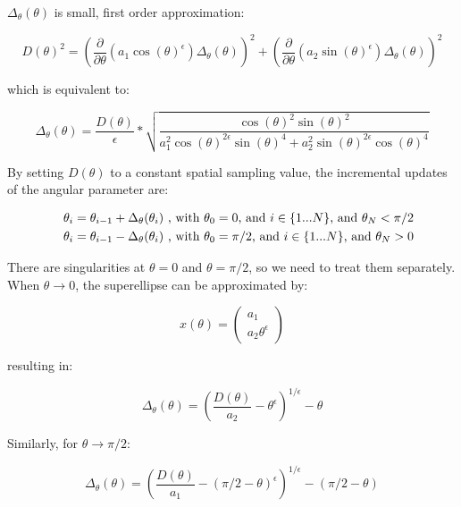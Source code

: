 \documentclass{article}
\begin{document}
$\Delta_\theta(\theta)$ is small, first order approximation:

\begin{equation}
D(\theta)^2 = \left( \frac{\partial}{\partial \theta} (a_1 \cos (\theta)^\epsilon) \Delta_\theta (\theta) \right)^2 + 
\left( \frac{\partial}{\partial \theta} (a_2 \sin (\theta)^\epsilon) \Delta_\theta (\theta) \right)^2
\end{equation}

which is equivalent to:

\begin{equation}
\Delta_\theta (\theta) = \frac{D(\theta)}{\epsilon} * \sqrt {\frac{ \cos (\theta) ^2 \sin (\theta) ^2} {a_1^2 \cos (\theta)^{2\epsilon} \sin(\theta)^4 + a_2^2 \sin (\theta)^{2\epsilon} \cos(\theta)^4}}
\end{equation}

By setting $D(\theta)$ to a constant spatial sampling value, the incremental updates of the angular parameter are:

\begin{eqnarray}
&& \theta_i = \theta_{i-1} + \Delta_\theta (\theta_i) \textnormal{ , with } \theta_0 = 0 \textnormal{, and } i \in \{ 1 ... N \} \textnormal {, and } \theta_N < \pi / 2 \\
&& \theta_i = \theta_{i-1} - \Delta_\theta (\theta_i) \textnormal{ , with } \theta_0 = \pi/2 \textnormal{, and } i \in \{ 1 ... N \} \textnormal {, and } \theta_N > 0
\end{eqnarray}

There are singularities at $\theta = 0$ and $\theta = \pi/2$, so we need to treat them separately. When $\theta \rightarrow 0$, the superellipse can be approximated by:

\begin{equation}
x (\theta) = \begin{pmatrix} a_1 \\ a_2 \theta ^\epsilon \end{pmatrix}
\end{equation}

resulting in:

\begin{equation}
\Delta_\theta (\theta) = \left(\frac{D (\theta)}{a_2} - \theta^\epsilon \right)^{1/\epsilon} - \theta
\end{equation}

Similarly, for $\theta \rightarrow \pi/2$:

\begin{equation}
\Delta_\theta (\theta) = \left( \frac{D(\theta)}{a_1} - (\pi/2 - \theta)^\epsilon \right)^{1/\epsilon} - (\pi/2 - \theta)
\end{equation}
\end{document}
